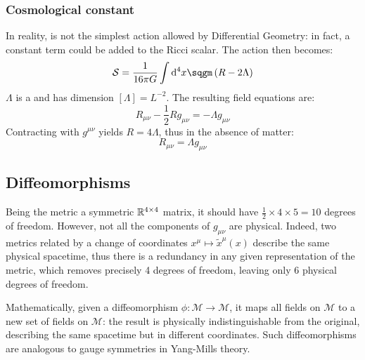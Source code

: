\subsubsection{Cosmological constant}

In reality,  is not the simplest action allowed by Differential Geometry: in fact, a constant term could be added to the Ricci scalar. The action then becomes:
\begin{equation}
  \mathcal{S} = \frac{1}{16 \pi G} \int \dd^4 x \sqgm \left( R - 2 \Lambda \right)
\end{equation}
$ \Lambda $ is a  and has dimension $ [\Lambda] = L^{-2} $. The resulting field equations are:
\begin{equation}
  R_{\mu \nu} - \frac{1}{2} R g_{\mu \nu} = - \Lambda g_{\mu \nu}
\end{equation}
Contracting with $ g^{\mu \nu} $ yields $ R = 4\Lambda $, thus in the absence of matter:
\begin{equation}
  R_{\mu \nu} = \Lambda g_{\mu \nu}
\end{equation}

\subsection{Diffeomorphisms}

Being the metric a symmetric $ \mathbb{R}^{4 \times 4} $ matrix, it should have $ \frac{1}{2} \times 4 \times 5 = 10 $ degrees of freedom. However, not all the components of $ g_{\mu \nu} $ are physical. Indeed, two metrics related by a change of coordinates $ x^\mu \mapsto \tilde{x}^\mu(x) $ describe the same physical spacetime, thus there is a redundancy in any given representation of the metric, which removes precisely 4 degrees of freedom, leaving only 6 physical degrees of freedom.

Mathematically, given a diffeomorphism $ \phi : \mathcal{M} \rightarrow \mathcal{M} $, it maps all fields on $ \mathcal{M} $ to a new set of fields on $ \mathcal{M} $: the result is physically indistinguishable from the original, describing the same spacetime but in different coordinates. Such diffeomorphisms are analogous to gauge symmetries in Yang-Mills theory.

